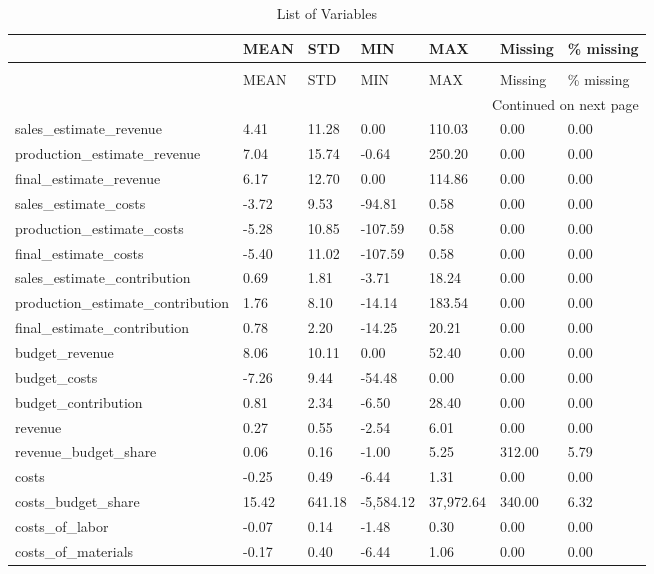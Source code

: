 \begin{landscape}\begin{longtable}[h!]{lllllll}
\caption{List of Variables} \label{eda_1} \\
\toprule
 & MEAN & STD & MIN & MAX & Missing & \% missing \\
\midrule
\endfirsthead
\caption[]{List of Variables} \\
\toprule
 & MEAN & STD & MIN & MAX & Missing & \% missing \\
\midrule
\endhead
\midrule
\multicolumn{7}{r}{Continued on next page} \\
\midrule
\endfoot
\bottomrule
\endlastfoot
sales_estimate_revenue & 4.41 & 11.28 & 0.00 & 110.03 & 0.00 & 0.00 \\
production_estimate_revenue & 7.04 & 15.74 & -0.64 & 250.20 & 0.00 & 0.00 \\
final_estimate_revenue & 6.17 & 12.70 & 0.00 & 114.86 & 0.00 & 0.00 \\
sales_estimate_costs & -3.72 & 9.53 & -94.81 & 0.58 & 0.00 & 0.00 \\
production_estimate_costs & -5.28 & 10.85 & -107.59 & 0.58 & 0.00 & 0.00 \\
final_estimate_costs & -5.40 & 11.02 & -107.59 & 0.58 & 0.00 & 0.00 \\
sales_estimate_contribution & 0.69 & 1.81 & -3.71 & 18.24 & 0.00 & 0.00 \\
production_estimate_contribution & 1.76 & 8.10 & -14.14 & 183.54 & 0.00 & 0.00 \\
final_estimate_contribution & 0.78 & 2.20 & -14.25 & 20.21 & 0.00 & 0.00 \\
budget_revenue & 8.06 & 10.11 & 0.00 & 52.40 & 0.00 & 0.00 \\
budget_costs & -7.26 & 9.44 & -54.48 & 0.00 & 0.00 & 0.00 \\
budget_contribution & 0.81 & 2.34 & -6.50 & 28.40 & 0.00 & 0.00 \\
revenue & 0.27 & 0.55 & -2.54 & 6.01 & 0.00 & 0.00 \\
revenue_budget_share & 0.06 & 0.16 & -1.00 & 5.25 & 312.00 & 5.79 \\
costs & -0.25 & 0.49 & -6.44 & 1.31 & 0.00 & 0.00 \\
costs_budget_share & 15.42 & 641.18 & -5,584.12 & 37,972.64 & 340.00 & 6.32 \\
costs_of_labor & -0.07 & 0.14 & -1.48 & 0.30 & 0.00 & 0.00 \\
costs_of_materials & -0.17 & 0.40 & -6.44 & 1.06 & 0.00 & 0.00 \\

\end{longtable}
\end{landscape}

